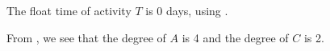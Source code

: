 \begin{subquestions}
\begin{subsubquestions}

\subsubquestion

The float time of activity $T$ is 0 days, using .

\end{subsubquestions}


\subquestion

From , we see that the degree of $A$ is 4 and the degree of $C$ is 2.


\subquestion

\begin{subsubquestions}

\subsubquestion 


\end{subsubquestions}
\end{subquestions}
